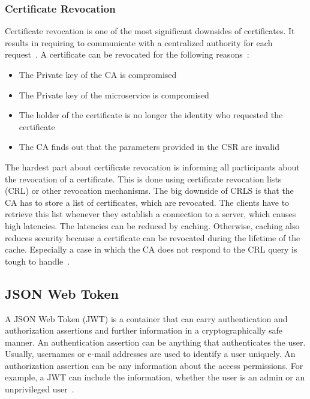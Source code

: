 \subsubsection{Certificate Revocation}
Certificate revocation is one of the most significant downsides of certificates.
It results in requiring to communicate with a centralized authority for each request~\cite{dias2020microservices}.
A certificate can be revocated for the following reasons~\cite{dias2020microservices}: 
\begin{itemize}
    \item The Private key of the CA is compromised
    \item The Private key of the microservice is compromised
    \item The holder of the certificate is no longer the identity who requested the certificate 
    \item The CA finds out that the parameters provided in the CSR are invalid
\end{itemize}
The hardest part about certificate revocation is informing all participants about the revocation of a certificate.
This is done using certificate revocation lists (CRL) or other revocation mechanisms.
The big downside of CRLS is that the CA has to store a list of certificates, which are revocated.
The clients have to retrieve this list whenever they establish a connection to a server, which causes high latencies.
The latencies can be reduced by caching.
Otherwise, caching also reduces security because a certificate can be revocated during the lifetime of the cache.
Especially a case in which the CA does not respond to the CRL query is tough to handle~\cite{dias2020microservices}.


\subsection{JSON Web Token}
A JSON Web Token (JWT) is a container that can carry authentication and authorization assertions and further information in a cryptographically safe manner.
An authentication assertion can be anything that authenticates the user.
Usually, usernames or e-mail addresses are used to identify a user uniquely.
An authorization assertion can be any information about the access permissions.
For example, a JWT can include the information, whether the user is an admin or an unprivileged user~\cite{dias2020microservices}. 

